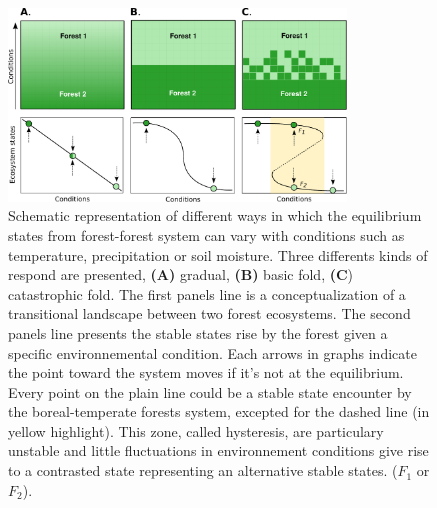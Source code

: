 \begin{figure}[t]
	\begin{center}
	\includegraphics[width=0.8\textwidth]{fig/states.pdf}
	\end{center}
	\caption{Schematic representation of different ways in which the equilibrium
	states from forest-forest system can vary with conditions such as temperature, precipitation
	or soil moisture. Three differents kinds of respond are presented,
	\textbf{(A)} gradual, \textbf{(B)} basic fold, \textbf{(C}) catastrophic fold.
	The first panels line is a conceptualization of a transitional landscape
	between two forest ecosystems. The second panels 
	line presents the stable states rise by the forest
	given a specific environnemental condition. Each arrows in graphs indicate the
	point toward the system moves if it's not at the equilibrium. Every point on
	the plain line could be a stable state encounter by the boreal-temperate
	forests system, excepted for the dashed line (in yellow highlight). This zone,
	called hysteresis, are particulary unstable and little fluctuations in
	environnement conditions give rise to a contrasted state representing an
	alternative stable states. ($F_1$ or $F_2$).}
	\label{fig1}
\end{figure}


